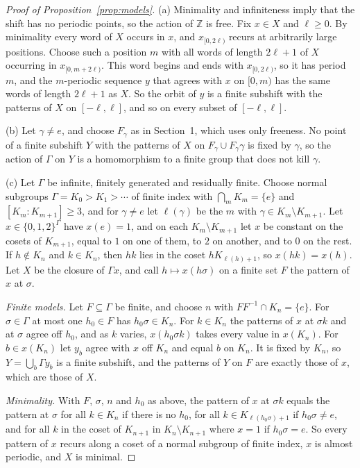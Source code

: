 \documentclass[11pt]{amsart}
\newcommand{\Z}{\mathbb Z}
\begin{document}
\begin{proof}[Proof of Proposition~\ref{prop:models}]
(a) Minimality and infiniteness imply that the shift has no periodic
points, so the action of $\Z$ is free. Fix $x\in X$ and $\ell\ge0$. By
minimality every word of $X$ occurs in $x$, and $x_{[0,2\ell)}$ recurs at
arbitrarily large positions. Choose such a position $m$ with all words of
length $2\ell+1$ of $X$ occurring in $x_{[0,m+2\ell)}$. This word begins
and ends with $x_{[0,2\ell)}$, so it has period $m$, and the $m$-periodic
sequence $y$ that agrees with $x$ on $[0,m)$ has the same words of length
$2\ell+1$ as $X$. So the orbit of $y$ is a finite subshift with the
patterns of $X$ on $[-\ell,\ell]$, and so on every subset of $[-\ell,\ell]$.

(b) Let $\gamma\ne e$, and choose $F_\gamma$ as in Section~1, which uses
only freeness. No point of a finite subshift $Y$ with the patterns of $X$
on $F_\gamma\cup F_\gamma\gamma$ is fixed by $\gamma$, so the action of
$\Gamma$ on $Y$ is a homomorphism to a finite group that does not kill
$\gamma$.

(c) Let $\Gamma$ be infinite, finitely generated and residually finite.
Choose normal subgroups $\Gamma=K_0>K_1>\cdots$ of finite index with
$\bigcap_mK_m=\{e\}$ and $[K_m:K_{m+1}]\ge3$, and for $\gamma\ne e$ let
$\ell(\gamma)$ be the $m$ with $\gamma\in K_m\setminus K_{m+1}$. Let
$x\in\{0,1,2\}^\Gamma$ have $x(e)=1$, and on each $K_m\setminus K_{m+1}$ let
$x$ be constant on the cosets of $K_{m+1}$, equal to $1$ on one of them,
to $2$ on another, and to $0$ on the rest. If $h\notin K_n$ and $k\in K_n$,
then $hk$ lies in the coset $hK_{\ell(h)+1}$, so $x(hk)=x(h)$. Let $X$ be
the closure of $\Gamma x$, and call $h\mapsto x(h\sigma)$ on a finite set
$F$ the pattern of $x$ at $\sigma$.

\emph{Finite models.} Let $F\subseteq\Gamma$ be finite, and choose $n$ with
$FF^{-1}\cap K_n=\{e\}$. For $\sigma\in\Gamma$ at most one $h_0\in F$ has
$h_0\sigma\in K_n$. For $k\in K_n$ the patterns of $x$ at $\sigma k$ and at
$\sigma$ agree off $h_0$, and as $k$ varies,
$x(h_0\sigma k)$ takes every value in $x(K_n)$. For $b\in x(K_n)$ let $y_b$
agree with $x$ off $K_n$ and equal $b$ on $K_n$. It is fixed by $K_n$, so
$Y=\bigcup_b\Gamma y_b$ is a finite subshift, and the patterns of $Y$ on
$F$ are exactly those of $x$, which are those of $X$.

\emph{Minimality.} With $F$, $\sigma$, $n$ and $h_0$ as above, the pattern
of $x$ at $\sigma k$ equals the pattern at $\sigma$ for all $k\in K_n$ if
there is no $h_0$, for all $k\in K_{\ell(h_0\sigma)+1}$ if $h_0\sigma\ne e$,
and for all $k$ in the coset of $K_{n+1}$ in $K_n\setminus K_{n+1}$ where
$x=1$ if $h_0\sigma=e$. So every pattern of $x$ recurs along a coset of a
normal subgroup of finite index, $x$ is almost periodic, and $X$ is
minimal.


\end{proof}
\end{document}
